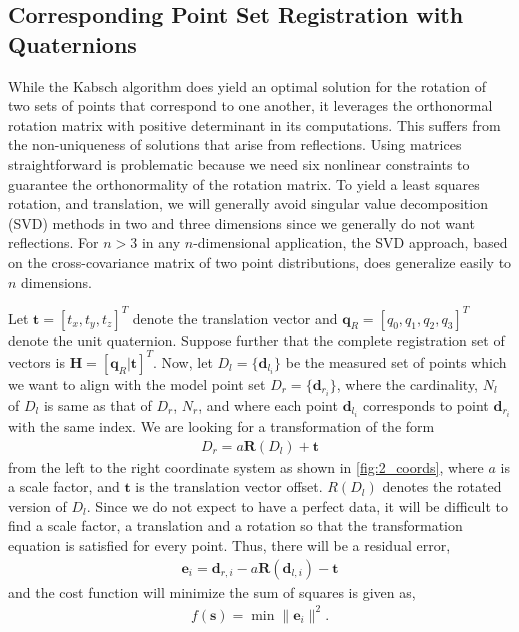 \subsection{Corresponding Point Set Registration with Quaternions}
\label{chap:opt_rot::pt_set_rot}

While the Kabsch algorithm does yield an optimal solution for the rotation of two sets of points that correspond to one another, it leverages the orthonormal rotation matrix with positive determinant in its computations.  This suffers from the non-uniqueness of solutions that arise from reflections. Using matrices straightforward is problematic because we need six nonlinear constraints to guarantee the orthonormality of the rotation matrix. To yield a least squares rotation, and translation, we will generally avoid singular value decomposition (SVD) methods in two and three dimensions since we generally do not want reflections. For $n>3$ in any $n$-dimensional application, the SVD approach, based on the cross-covariance matrix of two point distributions, does generalize easily to $n$ dimensions.

Let $\bm{t} = [t_x, t_y, t_z]^T$ denote the translation vector and $\bm{q}_R = \left[q_0, q_1, q_2, q_3\right]^T$ denote the unit quaternion. Suppose further that the complete registration set of vectors is $\bm{H} = \left[\bm{q}_R | \bm{t}\right]^T$. Now, let $D_l = \{\bm{d}_{l_i}\}$ be the measured set of points which we want to align with the model point set $D_r =\{\bm{d}_{r_i}\}$, where the cardinality, $N_l$ of $D_l$ is same as that of $D_r$, $N_r$, and where each point $\bm{d}_{l_i}$ corresponds to point $\bm{d}_{r_i}$ with the same index. We are looking for a transformation of the form
%
\begin{align}
	D_{r} = a\bm{R}(D_l) + \bm{t}
\end{align}
%
from the left to the right coordinate system as shown in \autoref{fig:2_coords}, where $a$ is a scale factor, and $\bm{t}$ is the translation vector offset. $R(D_l)$ denotes the rotated version of $D_l$. Since we do not expect to have a perfect data, it will be difficult to find a scale factor, a translation and a rotation so that the transformation equation is satisfied for every point. Thus, there will be a residual error, 
%
\begin{align}
	\bm{e}_i = \bm{d}_{r,i} - a \bm{R}(\bm{d}_{l,i}) - \bm{t}
\end{align}
%
and the cost function will minimize the sum of squares is given as, 
%
\begin{align}
f(\bm{s}) = 	\min \| \bm{e}_i\|^2.
\end{align}
%
